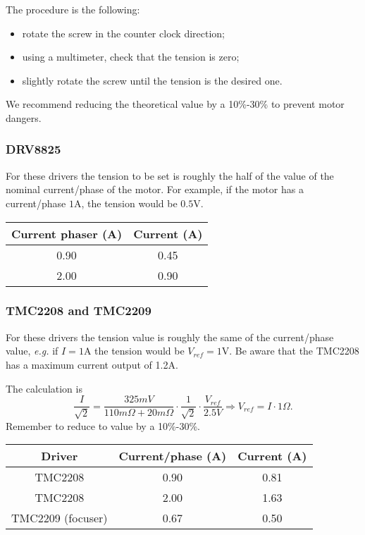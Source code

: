 The procedure is the following:
\begin{itemize}
    \item rotate the screw in the counter clock direction;
    \item using a multimeter, check that the tension is zero;
    \item slightly rotate the screw until the tension is the desired one.
\end{itemize}
We recommend reducing the theoretical value by a 10\%-30\% to prevent motor dangers.

\subsubsection{DRV8825}
For these drivers the tension to be set is roughly the half of the value of the nominal current/phase of the motor.
For example, if the motor has a current/phase \(1\)A, the tension would be \(0.5\)V.

\begin{minipage}
    {.4\textwidth}
    \begin{tabular}{cc}
        Current phaser (A) & Current (A) \\
        \hline
        0.90 & 0.45 \\
        2.00 & 0.90             
    \end{tabular}
    \label{tab:drivers_curr}
\end{minipage} 

\subsubsection{TMC2208 and TMC2209}
For these drivers the tension value is roughly the same of the current/phase value, \textit{e.g.} if \(I=1\)A the tension would be \(V_{ref}=1\)V.
Be aware that the TMC2208 has a maximum current output of 1.2A.

The calculation is 
\[\frac{I}{\sqrt{2}}=\frac{325mV}{110m\Omega+20m\Omega}\cdot\frac{1}{\sqrt{2}}\cdot\frac{V_{ref}}{2.5V}\Rightarrow V_{ref} = I \cdot 1\Omega.\]
Remember to reduce to value by a 10\%-30\%.

\begin{minipage}
    {.4\textwidth}
    \begin{tabular}{ccc}
       Driver & Current/phase (A) & Current (A) \\
        \hline
       TMC2208 & 0.90 & 0.81 \\
       TMC2208 &  2.00 & 1.63 \\                
       TMC2209 (focuser) &  0.67 & 0.50                
    \end{tabular}
    \label{tab:drivers_curr}
\end{minipage} 



